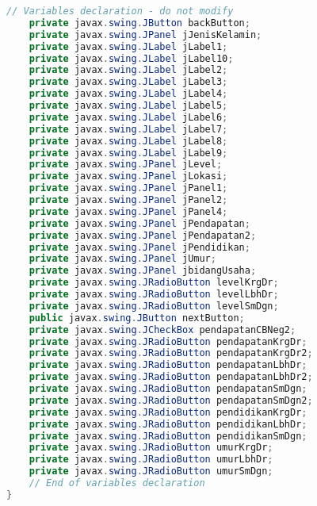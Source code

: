 \begin{lstlisting}[language=Java, caption=TampilanKondisiKetetanggaan.java]
    // Variables declaration - do not modify                     
    private javax.swing.JButton backButton;
    private javax.swing.JPanel jJenisKelamin;
    private javax.swing.JLabel jLabel1;
    private javax.swing.JLabel jLabel10;
    private javax.swing.JLabel jLabel2;
    private javax.swing.JLabel jLabel3;
    private javax.swing.JLabel jLabel4;
    private javax.swing.JLabel jLabel5;
    private javax.swing.JLabel jLabel6;
    private javax.swing.JLabel jLabel7;
    private javax.swing.JLabel jLabel8;
    private javax.swing.JLabel jLabel9;
    private javax.swing.JPanel jLevel;
    private javax.swing.JPanel jLokasi;
    private javax.swing.JPanel jPanel1;
    private javax.swing.JPanel jPanel2;
    private javax.swing.JPanel jPanel4;
    private javax.swing.JPanel jPendapatan;
    private javax.swing.JPanel jPendapatan2;
    private javax.swing.JPanel jPendidikan;
    private javax.swing.JPanel jUmur;
    private javax.swing.JPanel jbidangUsaha;
    private javax.swing.JRadioButton levelKrgDr;
    private javax.swing.JRadioButton levelLbhDr;
    private javax.swing.JRadioButton levelSmDgn;
    public javax.swing.JButton nextButton;
    private javax.swing.JCheckBox pendapatanCBNeg2;
    private javax.swing.JRadioButton pendapatanKrgDr;
    private javax.swing.JRadioButton pendapatanKrgDr2;
    private javax.swing.JRadioButton pendapatanLbhDr;
    private javax.swing.JRadioButton pendapatanLbhDr2;
    private javax.swing.JRadioButton pendapatanSmDgn;
    private javax.swing.JRadioButton pendapatanSmDgn2;
    private javax.swing.JRadioButton pendidikanKrgDr;
    private javax.swing.JRadioButton pendidikanLbhDr;
    private javax.swing.JRadioButton pendidikanSmDgn;
    private javax.swing.JRadioButton umurKrgDr;
    private javax.swing.JRadioButton umurLbhDr;
    private javax.swing.JRadioButton umurSmDgn;
    // End of variables declaration                   
}

\end{lstlisting}

